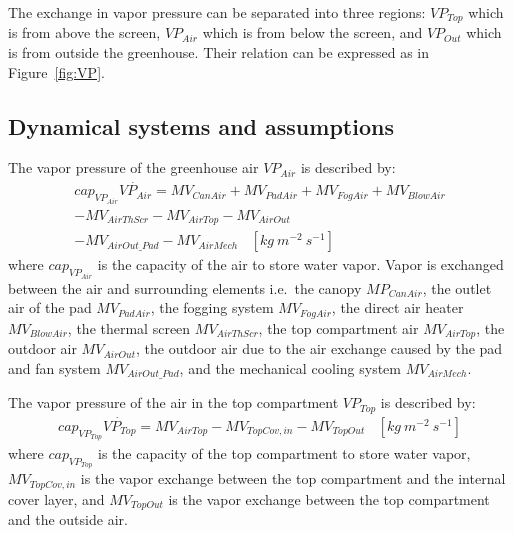 \documentclass[a4paper]{article}
\numberwithin{equation}{section}
\begin{document}
The exchange in vapor pressure can be separated into three regions: \( VP_{Top} \) which is from above the screen, \( VP_{Air} \) which is from below the screen, and \( VP_{Out} \) which is from outside the greenhouse.
Their relation can be expressed as in Figure~\ref{fig:VP}.

\subsection{Dynamical systems and assumptions}
The vapor pressure of the greenhouse air \( VP_{Air} \) is described by:
\begin{multline*}
  cap_{VP_{Air}}\dot{VP_{Air}} = MV_{CanAir} + MV_{PadAir} + MV_{FogAir} + MV_{BlowAir} \\
  - MV_{AirThScr} - MV_{AirTop} - MV_{AirOut} \\
  - MV_{AirOut\_Pad} - MV_{AirMech} ~~~~ [kg\ m^{-2}\ s^{-1}]
\end{multline*}
where \( cap_{VP_{Air}} \) is the capacity of the air to store water vapor.
Vapor is exchanged between the air and surrounding elements i.e.\ the canopy \( MP_{CanAir} \), the outlet air of the pad \( MV_{PadAir} \), the fogging system \( MV_{FogAir} \), the direct air heater \( MV_{BlowAir} \), the thermal screen \( MV_{AirThScr} \), the top compartment air \( MV_{AirTop} \), the outdoor air \( MV_{AirOut} \), the outdoor air due to the air exchange caused by the pad and fan system \( MV_{AirOut\_Pad} \), and the mechanical cooling system \( MV_{AirMech} \).

The vapor pressure of the air in the top compartment \( VP_{Top} \) is described by:
\begin{multline*}
  cap_{VP_{Top}}\dot{VP_{Top}} = MV_{AirTop} - MV_{TopCov,in} - MV_{TopOut} ~~~~ [kg\ m^{-2}\ s^{-1}]
\end{multline*}
where \( cap_{VP_{Top}} \) is the capacity of the top compartment to store water vapor, \( MV_{TopCov,in} \) is the vapor exchange between the top compartment and the internal cover layer, and \( MV_{TopOut} \) is the vapor exchange between the top compartment and the outside air.
\end{document}
